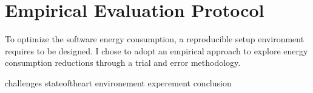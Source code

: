 \newpage
\label{chapter:benchmarking}
\chapter{Empirical Evaluation Protocol}


To optimize the software energy consumption, a reproducible setup environment requires to be designed.
I chose to adopt an empirical approach to explore energy consumption reductions through a trial and error methodology.


{challenges}
{stateoftheart}
{environement}
{experement}
{conclusion}

